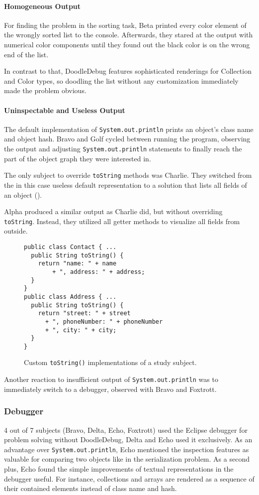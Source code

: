 \documentclass[english]{scrartcl}
\newcommand{\DD}{Dood\-le\-De\-bug\xspace}
\newcommand{\println}{\texttt{Sys\-tem.\-out.\-println}\xspace}
\begin{document}
\paragraph{Homogeneous Output}
For finding the problem in the sorting task, Beta printed every color element of the wrongly sorted list to the console.
Afterwards, they stared at the output with numerical color components until they found out the black color is on the wrong end of the list.

In contrast to that, \DD features sophisticated renderings for Collection and Color types, so doodling the list without any customization immediately made the problem obvious.

\paragraph{Uninspectable and Useless Output}
The default implementation of \println prints an object's class name and object hash.
Bravo and Golf cycled between running the program, observing the output and adjusting \println statements to finally reach the part of the object graph they were interested in.

The only subject to override \texttt{toString} methods was Charlie.
They switched from the in this case useless default representation to a solution that lists all fields of an object ().

Alpha produced a similar output as Charlie did, but without overriding \texttt{toString}.
Instead, they utilized all getter methods to visualize all fields from outside.

\begin{figure}[h]
\begin{lstlisting}
public class Contact { ...
  public String toString() { 
    return "name: " + name 
        + ", address: " + address;
  }
}
public class Address { ...
  public String toString() {
    return "street: " + street
      + ", phoneNumber: " + phoneNumber
      + ", city: " + city;
  }
}
\end{lstlisting}
  \caption{Custom \texttt{toString()} implementations of a study subject.}
\end{figure}

Another reaction to insufficient output of \println was to immediately switch to a debugger, observed with Bravo and Foxtrott.

\subsubsection{Debugger}
4 out of 7 subjects (Bravo, Delta, Echo, Foxtrott) used the Eclipse debugger for problem solving without \DD, Delta and Echo used it exclusively.
As an advantage over \println, Echo mentioned the inspection features as valuable for comparing two objects like in the serialization problem.
As a second plus, Echo found the simple improvements of textual representations in the debugger useful.
For instance, collections and arrays are rendered as a sequence of their contained elements instead of class name and hash.
\end{document}
